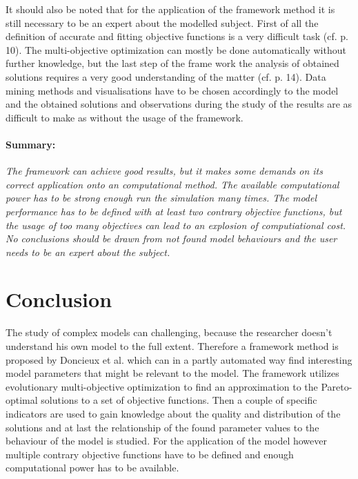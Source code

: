 \documentclass[12pt,twoside]{article}
\theoremstyle{plain}
\theoremstyle{definition}
\theoremstyle{remark}
\begin{document}
It should also be noted that for the application of the framework method it is still necessary to be an expert about the modelled subject.
First of all the definition of accurate and fitting objective functions is a very difficult task (cf. \cite{doncieux2015multi} p. 10). 
The multi-objective optimization can mostly be done automatically without further knowledge, but the last step of the frame work the analysis of obtained solutions requires a very good understanding of the matter (cf. \cite{doncieux2015multi} p. 14). 
Data mining methods and visualisations have to be chosen accordingly to the model and the obtained solutions and observations during the study of the results are as difficult to make as without the usage of the framework.

\paragraph{Summary:}
\textit{
	The framework can achieve good results, but it makes some demands on its correct application onto an computational method.
	The available computational power has to be strong enough run the simulation many times.
	The model performance has to be defined with at least two contrary objective functions, but the usage of too many objectives can lead to an explosion of computiational cost.
	No conclusions should be drawn from not found model behaviours and the user needs to be an expert about the subject.
}


\section{Conclusion}
\label{sec:concl}

The study of complex models can challenging, because the researcher doesn't understand his own model to the full extent.
Therefore a framework method is proposed by Doncieux et al. \cite{doncieux2015multi} which can in a partly automated way find interesting model parameters that might be relevant to the model. 
The framework utilizes evolutionary multi-objective optimization to find an approximation to the Pareto-optimal solutions to a set of objective functions.
Then a couple of specific indicators are used to gain knowledge about the quality and distribution of the solutions and at last the relationship of the found parameter values to the behaviour of the model is studied.
For the application of the model however multiple contrary objective functions have to be defined and enough computational power has to be available.\medskip
\end{document}

